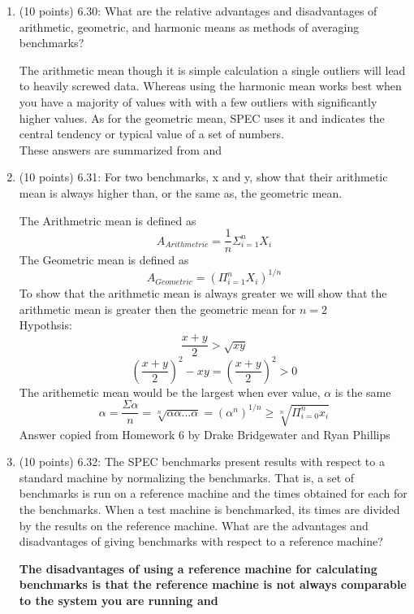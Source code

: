 \documentclass[letterpaper,10pt,onecolumn,titlepage]{article}
\begin{document}
\begin{enumerate}
\item (10 points) 6.30: What are the relative advantages and disadvantages of arithmetic, geometric, and harmonic means as methods of averaging benchmarks?\\
\begin{mdframed}[style=MyFrame]
The arithmetic mean though it is simple calculation a single outliers will lead to heavily screwed data. Whereas using the harmonic mean works best when you have a majority of values with with a few outliers with significantly higher values. As for the geometric mean, SPEC uses it and indicates the central tendency or typical value of a set of numbers. \\
These answers are summarized from \cite[The Economist at Large]{MeansDiff} and \cite[Wikipedia]{MeansWiki}
\end{mdframed}
\newpage
\item (10 points) 6.31: For two benchmarks, x and y, show that their arithmetic mean is always higher than, or the same as, the geometric mean.
\begin{mdframed}[style=MyFrame]
The Arithmetric mean is defined as 
\begin{equation}
A_{Arithmetric}=\frac{1}{n}\Sigma_{i=1}^nX_i
\end{equation}
The Geometric mean is defined as 
\begin{equation} 
A_{Geometric}=(\Pi_{i=1}^nX_i)^{1/n}
\end{equation}
To show that the arithmetic mean is always greater we will show that the arithmetic mean is greater then the geometric mean for $n=2$\\
Hypothsis:\begin{equation}
\frac{x+y}{2}>\sqrt{xy}
\end{equation}
\begin{equation}
(\frac{x+y}{2})^2-xy = (\frac{x+y}{2})^2 > 0
\end{equation}
The arithemetic mean would be the largest when ever value, $\alpha$ is the same
\begin{equation}
\alpha=\frac{\Sigma \alpha}{n}=\sqrt[n]{\alpha \alpha...\alpha}=(\alpha^n)^{1/n} \geq \sqrt[n]{\Pi_{i=0}^n x_i}
\end{equation}
Answer copied from Homework 6 by Drake Bridgewater and Ryan Phillips \cite{HW6}
\end{mdframed}
\item (10 points) 6.32: The SPEC benchmarks present results with respect to a standard machine by normalizing the benchmarks. That is, a set of benchmarks is run on a reference machine and the times obtained for each for the benchmarks. When a test machine is benchmarked, its times are divided by the results on the reference machine. What are the advantages and disadvantages of giving benchmarks with respect to a reference machine?
\begin{mdframed}[style=MyFrame]
\textbf{ The disadvantages of using a reference machine for calculating benchmarks is that the reference machine is not always comparable to the system you are running and }


\end{mdframed}
\end{enumerate}
\end{document}
